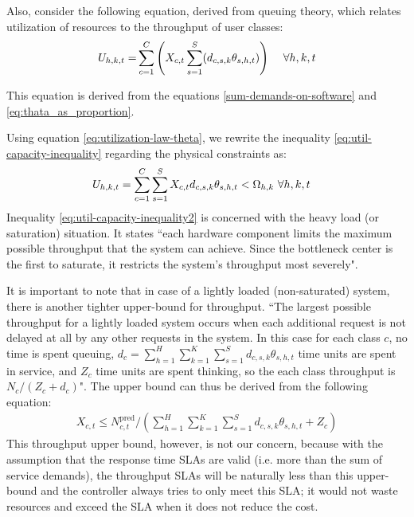  Also, consider the following equation, derived from queuing theory, which relates utilization of resources to the throughput of user classes:    
 \begin{eqnarray} \label{eq:utilization-law-theta}
    U_{h,k,t}   
    = & \sum_{c=1}^C \left(X_{c,t}  \sum_{s=1}^S (d_{c,s,k}\theta_{s,h,t})\right)  & \  \forall h,k,t    
   \end{eqnarray}        
  
 This equation is derived from the equations \ref{sum-demands-on-software} and \ref{eq:thata_as_proportion}.

 Using equation \ref{eq:utilization-law-theta}, we rewrite the inequality \ref{eq:util-capacity-inequality} regarding the physical constraints as: 
   \begin{align}
   \label{eq:util-capacity-inequality2}
   U_{h,k,t}   =     \sum_{c=1}^C \sum_{s=1}^S   X_{c,t} d_{c,s,k} \theta_{s,h,t}    < \Omega_{h,k}  & \  \forall h,k,t
    \end{align}  
Inequality \ref{eq:util-capacity-inequality2} is concerned with the heavy load (or saturation) situation.  
It states ``each hardware component limits the maximum possible throughput that the system can achieve. Since the bottleneck center is the first to saturate, it restricts the system's throughput most severely"\cite{lazowska1984quantitative}.

It is important to note that in case of a lightly loaded (non-saturated) system, there is another tighter upper-bound for throughput. 
``The largest possible throughput for a lightly loaded system occurs when each additional request is not delayed at all by any other requests in the system. In this case for each class $c$, no time is spent queuing, $d_c=\sum_{h=1}^H \sum_{k=1}^K \sum_{s=1}^S d_{c,s,k} \theta_{s,h,t}$ time units are spent in service, and $Z_c$ time units are spent thinking, so the each class throughput is $N_c/(Z_c+d_c)$"\cite{lazowska1984quantitative}.
 The upper bound can thus be derived from the following equation:
   \begin{align}
   \label{eq:natural-throughput-upper-bound}
X_{c,t}\leq N^{\text{pred}}_{c,t}/\left(\sum_{h=1}^H \sum_{k=1}^K \sum_{s=1}^S d_{c,s,k} \theta_{s,h,t} +Z_c\right) 
  \end{align}    
		This throughput upper bound, however, is not our concern, because with the assumption that the response time SLAs are valid (i.e. more than the sum of service demands), the throughput SLAs will be naturally less than this upper-bound and the controller always tries to only meet this SLA; it would not waste resources and exceed the SLA when it does not reduce the cost. 


